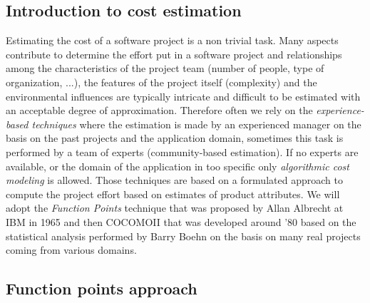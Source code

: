 
\subsection{Introduction to cost estimation}

Estimating the cost of a software project is a non trivial task. Many
aspects contribute to determine the effort put in a software project
and relationships among the characteristics of the project team (number
of people, type of organization, ...), the features of the project
itself (complexity) and the environmental influences are typically
intricate and difficult to be estimated with an acceptable degree
of approximation. Therefore often we rely on the \emph{experience-based
techniques} where the estimation is made by an experienced manager
on the basis on the past projects and the application domain, sometimes
this task is performed by a team of experts (community-based estimation).
If no experts are available, or the domain of the application in too
specific only \emph{algorithmic cost modeling }is allowed. Those techniques
are based on a formulated approach to compute the project effort based
on estimates of product attributes. We will adopt the \emph{Function
Points} technique that was proposed by Allan Albrecht at IBM in 1965
and then COCOMOII that was developed around '80 based on the statistical
analysis performed by Barry Boehn on the basis on many real projects
coming from various domains.


\subsection{Function points approach}


